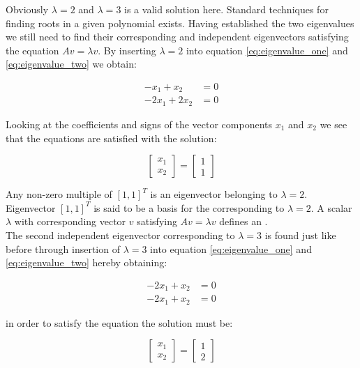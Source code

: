 Obviously $\lambda = 2$ and $\lambda = 3$ is a valid solution here.
Standard techniques for finding roots in a given
polynomial exists. Having established the two eigenvalues we still need to find their
corresponding and independent eigenvectors satisfying the equation $A
v = \lambda v$. By inserting $\lambda = 2$ into equation
\eqref{eq:eigenvalue_one} and \eqref{eq:eigenvalue_two} we obtain:

\begin{align}
-x_1 + x_2 & = 0 \\
-2x_1 + 2x_2 & = 0
\end{align}

Looking at the coefficients and signs of the vector components $x_1$
and $x_2$ we see that the equations are satisfied with the solution:

\begin{equation}
\begin{bmatrix}
x_1 \\ x_2
\end{bmatrix}
=
\begin{bmatrix}
1 \\ 1
\end{bmatrix}
\end{equation}

Any non-zero multiple of $[1,1]^T$ is an eigenvector belonging to
$\lambda = 2$. Eigenvector $[1,1]^T$ is said to be a basis for the
 corresponding to $\lambda = 2$.
A scalar $\lambda$ with corresponding vector $v$ satisfying 
$A v = \lambda v$ defines an . \\ 

The second independent eigenvector corresponding to $\lambda = 3$ is
found just like before through insertion of $\lambda = 3$ into equation
\eqref{eq:eigenvalue_one} and \eqref{eq:eigenvalue_two} hereby obtaining:

\begin{align}
\label{eq:eigenvalue_one_reduced}
-2x_1 + x_2 & = 0 \\
\label{eq:eigenvalue_two_reduces}
-2x_1 + x_2 & = 0
\end{align}

in order to satisfy the equation the solution must be:

\begin{equation}
\begin{bmatrix}
x_1 \\ x_2
\end{bmatrix}
=
\begin{bmatrix}
1 \\ 2
\end{bmatrix}
\end{equation}

